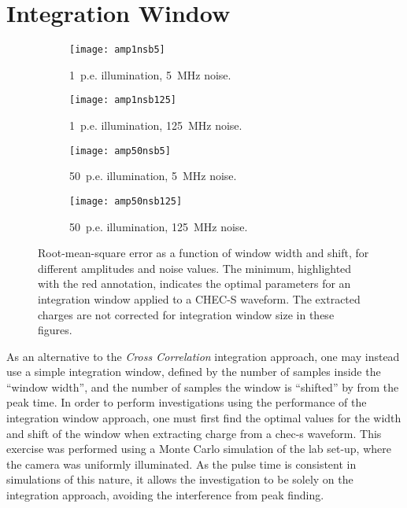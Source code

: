 \section{Integration Window}

\begin{figure}
  \begin{subfigure}[b]{0.49\textwidth}
    \texttt{[image: amp1nsb5]}
    \caption{1~p.e. illumination, 5~MHz noise.}
    \label{fig:amp1nsb5}
  \end{subfigure}
  \hfill
  \begin{subfigure}[b]{0.49\textwidth}
    \texttt{[image: amp1nsb125]}
    \caption{1~p.e. illumination, 125~MHz noise.}
    \label{fig:amp1nsb125}
  \end{subfigure}
  \hfill
  \begin{subfigure}[b]{0.49\textwidth}
    \texttt{[image: amp50nsb5]}
    \caption{50~p.e. illumination, 5~MHz noise.}
    \label{fig:amp50nsb5}
  \end{subfigure}
  \hfill
  \begin{subfigure}[b]{0.49\textwidth}
    \texttt{[image: amp50nsb125]}
    \caption{50~p.e. illumination, 125~MHz noise.}
    \label{fig:amp50nsb125}
  \end{subfigure}
  \caption[Optimal integration window parameters.]{Root-mean-square error as a function of window width and shift, for different amplitudes and noise values. The minimum, highlighted with the red annotation, indicates the optimal parameters for an integration window applied to a CHEC-S waveform. The extracted charges are not corrected for integration window size in these figures.}
  \label{fig:rmse_noc}
\end{figure}

As an alternative to the \textit{Cross Correlation} integration approach, one may instead use a simple integration window, defined by the number of samples inside the ``window width'', and the number of samples the window is ``shifted'' by from the peak time. In order to perform investigations using the performance of the integration window approach, one must first find the optimal values for the width and shift of the window when extracting charge from a \gls{chec-s} waveform. This exercise was performed using a Monte Carlo simulation of the lab set-up, where the camera was uniformly illuminated. As the pulse time is consistent in simulations of this nature, it allows the investigation to be solely on the integration approach, avoiding the interference from peak finding.


